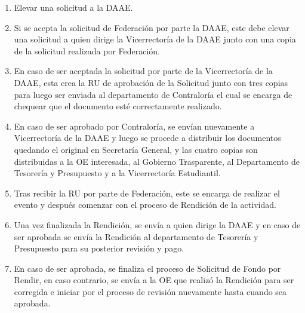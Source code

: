 \begin{enumerate}
    \item Elevar una solicitud a la DAAE. 
    \item Si se acepta la solicitud de Federación por parte la DAAE, este debe elevar una solicitud a quien dirige la Vicerrectoría de la DAAE junto con una copia de la solicitud realizada por Federación. 
    \item En caso de ser aceptada la solicitud por parte de la Vicerrectoría de la DAAE, esta crea la RU de aprobación de la Solicitud junto con tres copias para luego ser enviada al departamento de Contraloría el cual se encarga de chequear que el documento esté correctamente realizado. 
    \item En caso de ser aprobado por Contraloría, se envían nuevamente a Vicerrectoría de la DAAE y luego se procede a distribuir los documentos quedando el original en Secretaría General, y las cuatro copias son distribuidas a la OE interesada, al Gobierno Trasparente, al Departamento de Tesorería y Presupuesto y a la Vicerrectoría Estudiantil.
    \item Tras recibir la RU por parte de Federación, este se encarga de realizar el evento y después comenzar con el proceso de Rendición de la actividad. 
    \item Una vez finalizada la Rendición, se envía a quien dirige la DAAE y en caso de ser aprobada se envía la Rendición al departamento de Tesorería y Presupuesto para su posterior revisión y pago.
    \item En caso de ser aprobada, se finaliza el proceso de Solicitud de Fondo por Rendir, en caso contrario, se envía a la OE que realizó la Rendición para ser corregida e iniciar por el proceso de revisión nuevamente hasta cuando sea aprobada.
\end{enumerate}

